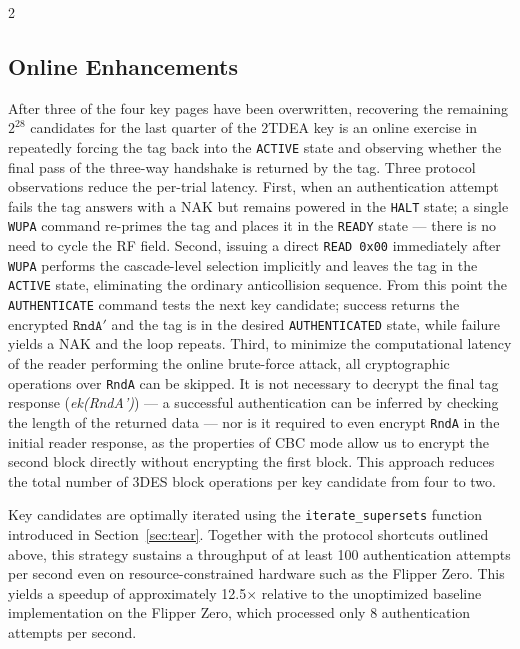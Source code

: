 \documentclass[10pt,letterpaper]{article}
\begin{document}
\begin{multicols}{2}
\subsection{Online Enhancements}
\label{sec:onlineoptimize}
After three of the four key pages have been overwritten, recovering the remaining \(2^{28}\) candidates for the last quarter of the 2TDEA key is an online exercise in repeatedly forcing the tag back into the \texttt{ACTIVE} state and observing whether the final pass of the three-way handshake is returned by the tag. Three protocol observations reduce the per-trial latency. First, when an authentication attempt fails the tag answers with a NAK but remains powered in the \texttt{HALT} state; a single \texttt{WUPA} command re-primes the tag and places it in the \texttt{READY} state --- there is no need to cycle the RF field.  Second, issuing a direct \texttt{READ~0x00} immediately after \texttt{WUPA} performs the cascade-level selection implicitly and leaves the tag in the \texttt{ACTIVE} state, eliminating the ordinary anticollision sequence. From this point the \texttt{AUTHENTICATE} command tests the next key candidate; success returns the encrypted \(\texttt{RndA}'\) and the tag is in the desired \texttt{AUTHENTICATED} state, while failure yields a NAK and the loop repeats.
Third, to minimize the computational latency of the reader performing the online brute-force attack, all cryptographic operations over \texttt{RndA} can be skipped. It is not necessary to decrypt the final tag response (\textit{ek(RndA')}) --- a successful authentication can be inferred by checking the length of the returned data --- nor is it required to even encrypt \texttt{RndA} in the initial reader response, as the properties of CBC mode allow us to encrypt the second block directly without encrypting the first block.
This approach reduces the total number of 3DES block operations per key candidate from four to two.

\begin{center}

\vspace{1mm}\newline
\captionsetup{hypcap=false}
\end{center}

Key candidates are optimally iterated using the \texttt{iterate\_supersets} function introduced in Section~\ref{sec:tear}. Together with the protocol shortcuts outlined above, this strategy sustains a throughput of at least 100 authentication attempts per second even on resource-constrained hardware such as the Flipper Zero. This yields a speedup of approximately 12.5$\times$ relative to the unoptimized baseline implementation on the Flipper Zero, which processed only 8 authentication attempts per second.


\end{multicols}
\end{document}
